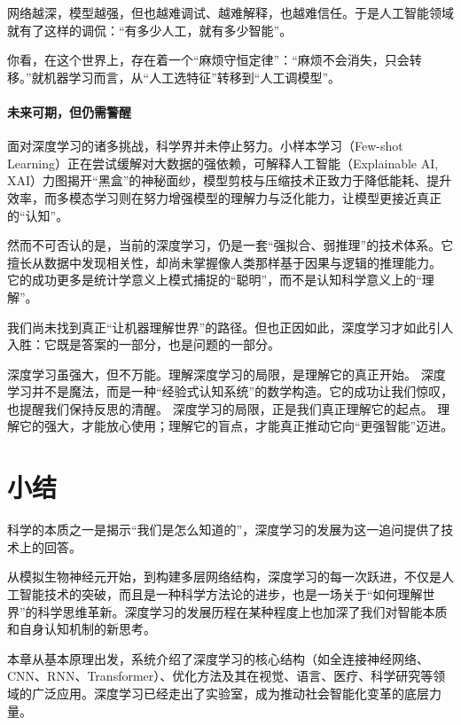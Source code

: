 网络越深，模型越强，但也越难调试、越难解释，也越难信任。于是人工智能领域就有了这样的调侃：“有多少人工，就有多少智能”。

你看，在这个世界上，存在着一个“麻烦守恒定律”：“麻烦不会消失，只会转移。”就机器学习而言，从“人工选特征”转移到“人工调模型”。

\paragraph*{未来可期，但仍需警醒}

面对深度学习的诸多挑战，科学界并未停止努力。小样本学习（Few-shot Learning）正在尝试缓解对大数据的强依赖，可解释人工智能（Explainable AI, XAI）力图揭开“黑盒”的神秘面纱，模型剪枝与压缩技术正致力于降低能耗、提升效率，而多模态学习则在努力增强模型的理解力与泛化能力，让模型更接近真正的“认知”。

然而不可否认的是，当前的深度学习，仍是一套“强拟合、弱推理”的技术体系。它擅长从数据中发现相关性，却尚未掌握像人类那样基于因果与逻辑的推理能力。
它的成功更多是统计学意义上模式捕捉的“聪明”，而不是认知科学意义上的“理解”。

我们尚未找到真正“让机器理解世界”的路径。但也正因如此，深度学习才如此引人入胜：它既是答案的一部分，也是问题的一部分。

深度学习虽强大，但不万能。理解深度学习的局限，是理解它的真正开始。
深度学习并不是魔法，而是一种“经验式认知系统”的数学构造。它的成功让我们惊叹，也提醒我们保持反思的清醒。
深度学习的局限，正是我们真正理解它的起点。
理解它的强大，才能放心使用；理解它的盲点，才能真正推动它向“更强智能”迈进。

\section{小结}

科学的本质之一是揭示“我们是怎么知道的”，深度学习的发展为这一追问提供了技术上的回答。

从模拟生物神经元开始，到构建多层网络结构，深度学习的每一次跃进，不仅是人工智能技术的突破，而且是一种科学方法论的进步，也是一场关于“如何理解世界”的科学思维革新。深度学习的发展历程在某种程度上也加深了我们对智能本质和自身认知机制的新思考。

本章从基本原理出发，系统介绍了深度学习的核心结构（如全连接神经网络、CNN、RNN、Transformer）、优化方法及其在视觉、语言、医疗、科学研究等领域的广泛应用。深度学习已经走出了实验室，成为推动社会智能化变革的底层力量。

